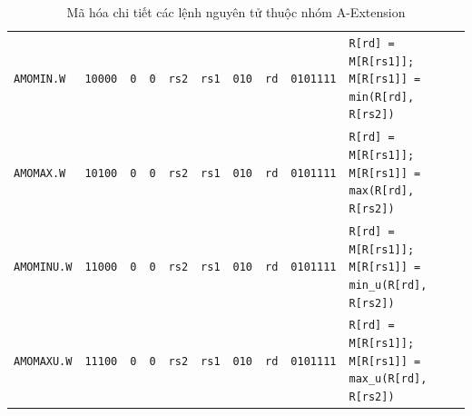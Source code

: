 \begin{table}[H]
\begin{tabularx}{\textwidth}{l c c c c c c c c X}
\texttt{AMOMIN.W} & \texttt{10000} & \texttt{0} & \texttt{0} & \texttt{rs2} & \texttt{rs1} & \texttt{010} & \texttt{rd} & \texttt{0101111} & \texttt{R[rd] = M[R[rs1]]; M[R[rs1]] = min(R[rd], R[rs2])} \\
\texttt{AMOMAX.W} & \texttt{10100} & \texttt{0} & \texttt{0} & \texttt{rs2} & \texttt{rs1} & \texttt{010} & \texttt{rd} & \texttt{0101111} & \texttt{R[rd] = M[R[rs1]]; M[R[rs1]] = max(R[rd], R[rs2])} \\
\texttt{AMOMINU.W}& \texttt{11000} & \texttt{0} & \texttt{0} & \texttt{rs2} & \texttt{rs1} & \texttt{010} & \texttt{rd} & \texttt{0101111} & \texttt{R[rd] = M[R[rs1]]; M[R[rs1]] = min\_u(R[rd], R[rs2])} \\
\texttt{AMOMAXU.W}& \texttt{11100} & \texttt{0} & \texttt{0} & \texttt{rs2} & \texttt{rs1} & \texttt{010} & \texttt{rd} & \texttt{0101111} & \texttt{R[rd] = M[R[rs1]]; M[R[rs1]] = max\_u(R[rd], R[rs2])} \\
\bottomrule
\end{tabularx}
\caption{Mã hóa chi tiết các lệnh nguyên tử thuộc nhóm A-Extension}
\label{tab:enc_atomic}
\end{table}

